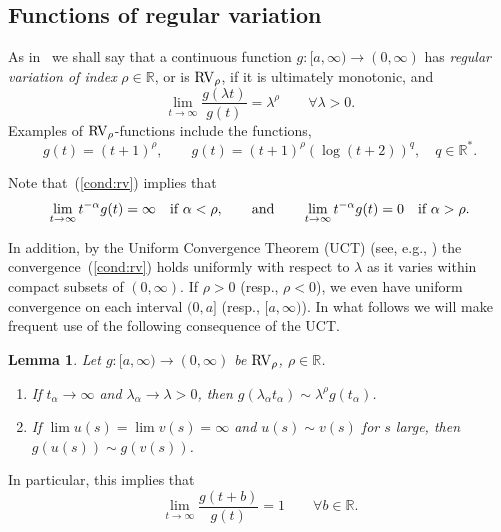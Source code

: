 \documentclass[10pt, a4paper]{amsart}
\newcommand{\R}{\mathbb{R}}
\numberwithin{equation}{section}
\newtheorem{lemma}[theorem]{Lemma}
\theoremstyle{definition}
\theoremstyle{remark}
\newcommand{\RV}{\textup{RV}}
\begin{document}
\subsection{Functions of regular variation}
As in~\cite{PT:Part1} we shall say that a continuous function $g:[a,\infty)\rightarrow (0,\infty)$ has \emph{regular variation of index} $\rho\in \R$, or is $\RV_\rho$, if it is 
 ultimately monotonic,  and
\begin{equation}\label{cond:rv}
 \lim_{t\rightarrow \infty} \frac{g(\lambda t)} {g(t)}= \lambda^\rho \qquad \forall \lambda>0.
\end{equation}
Examples of $\RV_\rho$-functions include the functions, 
\begin{equation*}
 g(t)=(t+1)^{\rho}, \qquad g(t)=(t+1)^\rho\left(\log(t+2)\right)^q, \quad q\in \R^*. 
\end{equation*}

Note that~(\ref{cond:rv}) implies that 
\begin{equation*}
 \lim_{t\rightarrow \infty} t^{-\alpha} g(t)=\infty \quad \text{if $ \alpha <\rho$}, \qquad \textup{and}\qquad
 \lim_{t\rightarrow \infty} t^{-\alpha} g(t)=0 \quad \text{if $ \alpha >\rho$}.
\end{equation*}

In addition, by the Uniform Convergence Theorem (UCT) (see, e.g., \cite[Theorem~1.5.2]{BGT:Cambridge87}) the convergence~(\ref{cond:rv}) holds uniformly with respect to $\lambda$ as it varies within compact subsets of $(0,\infty)$. If $\rho>0$ (resp., $\rho<0$), we even have uniform convergence on each interval $(0,a]$ (resp., $[a,\infty)$). In what follows we will make frequent use of the following consequence of the UCT.

\begin{lemma}\label{lem:UCT-consequence}
 Let $g:[a,\infty)\rightarrow (0,\infty)$ be $\RV_\rho$, $\rho\in \R$.
 \begin{enumerate}
 \item If $t_\alpha \rightarrow \infty$ and $\lambda_\alpha \rightarrow \lambda>0$, then $g(\lambda_\alpha t_\alpha)\sim \lambda^\rho g(t_\alpha)$.

 \item If $\lim u(s)=\lim v(s)=\infty$ and $u(s)\sim v(s)$ for $s$ large, then $g(u(s))\sim g(v(s))$.
 \end{enumerate}
 \end{lemma}

In particular, this implies that 
 \begin{equation*}
 \lim_{t\rightarrow \infty} \frac{g(t+b)}{g(t)}=1 \qquad \forall b\in \R.
\end{equation*}
\end{document}
